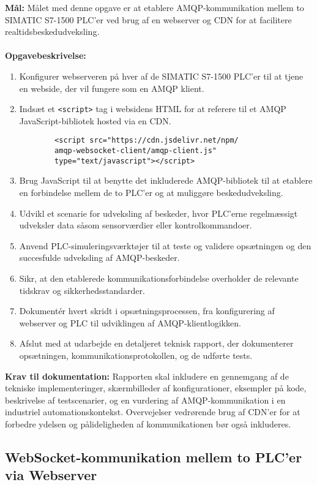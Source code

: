 \textbf{Mål:} Målet med denne opgave er at etablere AMQP-kommunikation mellem to SIMATIC S7-1500 PLC'er ved brug af en webserver og CDN for at facilitere realtidsbeskedudveksling.
\\\\
\noindent\textbf{Opgavebeskrivelse:}
\begin{enumerate}
	\item Konfigurer webserveren på hver af de SIMATIC S7-1500 PLC'er til at tjene en webside, der vil fungere som en AMQP klient.
	\item Indsæt et \texttt{<script>} tag i websidens HTML for at referere til et AMQP JavaScript-bibliotek hosted via en CDN.
	\begin{verbatim}
		<script src="https://cdn.jsdelivr.net/npm/
		amqp-websocket-client/amqp-client.js" 
		type="text/javascript"></script>
	\end{verbatim}
	\item Brug JavaScript til at benytte det inkluderede AMQP-bibliotek til at etablere en forbindelse mellem de to PLC'er og at muliggøre beskedudveksling.
	\item Udvikl et scenarie for udveksling af beskeder, hvor PLC'erne regelmæssigt udveksler data såsom sensorværdier eller kontrolkommandoer.
	\item Anvend PLC-simuleringsværktøjer til at teste og validere opsætningen og den succesfulde udveksling af AMQP-beskeder.
	\item Sikr, at den etablerede kommunikationsforbindelse overholder de relevante tidskrav og sikkerhedsstandarder.
	\item Dokumentér hvert skridt i opsætningsprocessen, fra konfigurering af webserver og PLC til udviklingen af AMQP-klientlogikken.
	\item Afslut med at udarbejde en detaljeret teknisk rapport, der dokumenterer opsætningen, kommunikationsprotokollen, og de udførte tests.
\end{enumerate}
\textbf{Krav til dokumentation:} Rapporten skal inkludere en gennemgang af de tekniske implementeringer, skærmbilleder af konfigurationer, eksempler på kode, beskrivelse af testscenarier, og en vurdering af AMQP-kommunikation i en industriel automationskontekst. Overvejelser vedrørende brug af CDN'er for at forbedre ydelsen og pålideligheden af kommunikationen bør også inkluderes.

\subsection*{WebSocket-kommunikation mellem to PLC'er via Webserver}
\label{subsec:websocket_communication_plc}

